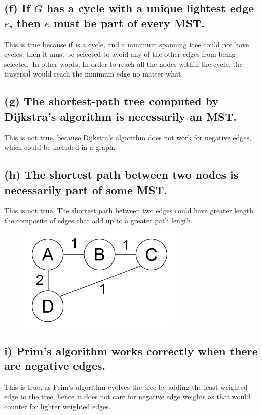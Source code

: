 \documentclass[10pt,letterpaper]{article}
\begin{document}
\subsection*{(f) If $G$ has a cycle with a unique lightest edge $e$, then $e$ must be part of every MST.}
This is true because if is a cycle, and a minimum spanning tree could not have cycles, then it must be selected to avoid any of the other edges from being selected. In other words, In order to reach all the nodes within the cycle, the traversal would reach the minimum edge no matter what. 
\subsection*{(g) The shortest-path tree computed by Dijkstra's algorithm is necessarily an MST.}
This is not true, because Dijkstra's algorithm does not work for negative edges, which could be included in a graph. 
\subsection*{(h) The shortest path between two nodes is necessarily part of some MST.}
This is not true. The shortest path between two edges could have greater length the composite of edges that add up to a greater path length. 
\begin{figure}[h!]
\centering
\includegraphics[width=0.7\textwidth]{"h) Graph.png"}
\end{figure}
\subsection*{i) Prim's algorithm works correctly when there are negative edges.}
This is true, as Prim's algorithm evolves the tree by adding the least weighted edge to the tree, hence it does not care for negative edge weights as that would counter for lighter weighted edges.
\hfill
\end{document}
